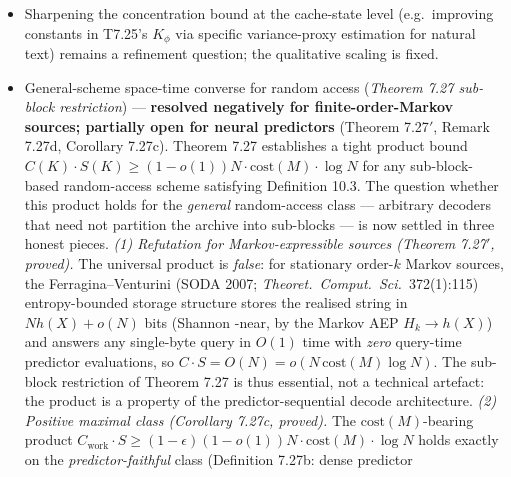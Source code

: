 \documentclass[
]{article}
\begin{document}
\begin{itemize}
  Knudsen-Tsitsiklis 1990 stack-distance representation, or via
  Aldous-Diaconis 1987 coupling for permutation-like Markov chains
  on LRU stack states, would tighten the constant. Theorem 7.26's
  qualitative $\sqrt{Q}$-Hoeffding scaling holds for any positive
  $\gamma_{\rm LRU}$; only the multiplicative constant is at stake.
  The non-IRM (workload-dependent) case --- where LRU concentration
  may genuinely fail, as shown by the $A, B, A, B, \ldots$
  counterexample of codex 2026-05 against $C=1$ --- remains
  out-of-scope of this paper's IRM hypothesis and may require
  workload-specific concentration analysis.
\item
  Sharpening the concentration bound at the cache-state level
  (e.g.\ improving constants in T7.25's $K_\phi$ via specific
  variance-proxy estimation for natural text) remains a refinement
  question; the qualitative scaling is fixed.
\item
  General-scheme space-time converse for random access
  (\emph{Theorem 7.27 sub-block restriction}) --- \textbf{resolved
  negatively for finite-order-Markov sources; partially open for neural
  predictors} (Theorem 7.27$'$, Remark 7.27d, Corollary 7.27c).
  Theorem 7.27 establishes a tight product bound $C(K) \cdot S(K) \geq
  (1 - o(1)) N \cdot \mathrm{cost}(M) \cdot \log N$ for any
  sub-block-based random-access scheme satisfying Definition 10.3. The
  question whether this product holds for the \emph{general}
  random-access class --- arbitrary decoders that need not partition the
  archive into sub-blocks --- is now settled in three honest pieces.
  \emph{(1) Refutation for Markov-expressible sources (Theorem 7.27$'$,
  proved).} The universal product is \emph{false}: for stationary
  order-$k$ Markov sources, the Ferragina--Venturini (SODA 2007;
  \emph{Theoret.\ Comput.\ Sci.}\ 372(1):115) entropy-bounded storage
  structure stores the realised string in $N h(X) + o(N)$ bits (Shannon
  -near, by the Markov AEP $H_k \to h(X)$) and answers any single-byte
  query in $O(1)$ time with \emph{zero} query-time predictor
  evaluations, so $C \cdot S = O(N) = o(N\,\mathrm{cost}(M)\log N)$. The
  sub-block restriction of Theorem 7.27 is thus essential, not a
  technical artefact: the product is a property of the
  predictor-sequential decode architecture. \emph{(2) Positive maximal
  class (Corollary 7.27c, proved).} The $\mathrm{cost}(M)$-bearing
  product $C_{\mathrm{work}} \cdot S \geq (1-\epsilon)(1-o(1)) N \cdot
  \mathrm{cost}(M) \cdot \log N$ holds exactly on the
  \emph{predictor-faithful} class (Definition 7.27b: dense predictor

\end{itemize}
\end{document}
